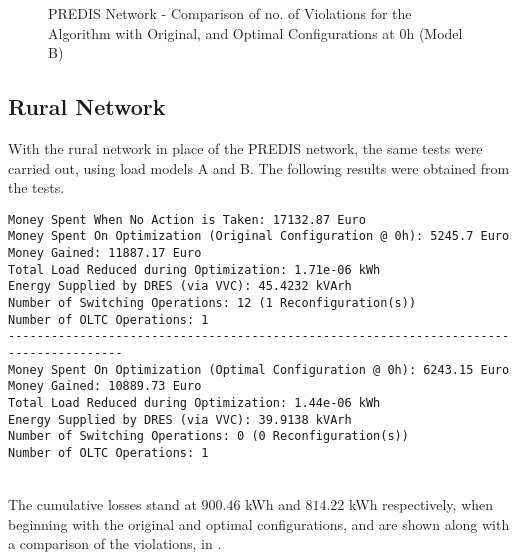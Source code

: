 \begin{figure}[!h]
\centering
    \setlength\figureheight{5cm}
    \setlength\figurewidth{14cm}
	
	\caption{PREDIS Network - Comparison of no. of Violations for the Algorithm with Original, and Optimal Configurations at $0$h (Model B)}
\end{figure}

\subsection{Rural Network}

With the rural network in place of the PREDIS network, the same tests were carried out, using load models A and B. The following results were obtained from the tests.

\begin{lstlisting}[title=Console Output With Load Model A]
Money Spent When No Action is Taken: 17132.87 Euro
Money Spent On Optimization (Original Configuration @ 0h): 5245.7 Euro
Money Gained: 11887.17 Euro
Total Load Reduced during Optimization: 1.71e-06 kWh
Energy Supplied by DRES (via VVC): 45.4232 kVArh
Number of Switching Operations: 12 (1 Reconfiguration(s))
Number of OLTC Operations: 1
--------------------------------------------------------------------------------------
Money Spent On Optimization (Optimal Configuration @ 0h): 6243.15 Euro
Money Gained: 10889.73 Euro
Total Load Reduced during Optimization: 1.44e-06 kWh
Energy Supplied by DRES (via VVC): 39.9138 kVArh
Number of Switching Operations: 0 (0 Reconfiguration(s))
Number of OLTC Operations: 1
\end{lstlisting}
\ \\
The cumulative losses stand at $900.46$ kWh and $814.22$ kWh respectively, when beginning with the original and optimal configurations, and are shown along with a comparison of the violations, in .\\

